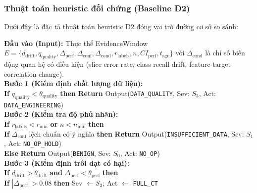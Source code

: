 \subsubsection{Thuật toán heuristic đối chứng (Baseline D2)}
Dưới đây là đặc tả thuật toán heuristic D2 đóng vai trò đường cơ sở so sánh:

\begin{tcolorbox}[colback=gray!3!white,colframe=gray!40!black,arc=2pt,boxrule=0.6pt,top=4pt,bottom=4pt,left=6pt,right=6pt,title=\small\textbf{Thuật toán 1 (Baseline D2): Chẩn đoán heuristic dựa trên tập luật ngưỡng cứng}]\label{alg:heuristic-diagnosis}
\small
\textbf{Đầu vào (Input):} Thực thể EvidenceWindow $E = \{d_\text{drift}, q_\text{quality}, \Delta_\text{perf}, \Delta_\text{conf}, \Delta_\text{cond}, r_\text{labels}, n, CI_\text{perf}, t_\text{age}\}$ với $\Delta_\text{cond}$ là chỉ số biến động quan hệ có điều kiện (slice error rate, class recall drift, feature-target correlation change).\\[0.3em]
\textbf{Bước 1 (Kiểm định chất lượng dữ liệu):}\\
\hspace*{1em}\textbf{If} $q_\text{quality} < \theta_\text{quality}$ \textbf{then} \textbf{Return} Output(\texttt{DATA\_QUALITY}, Sev: $S_3$, Act: \texttt{DATA\_ENGINEERING})\\[0.25em]
\textbf{Bước 2 (Kiểm tra độ phủ nhãn):}\\
\hspace*{1em}\textbf{If} $r_\text{labels} < r_\text{min}$ \textbf{or} $n < n_\text{min}$ \textbf{then}\\
\hspace*{2em}\textbf{If} $\Delta_\text{conf}$ lệch chuẩn có ý nghĩa \textbf{then} \textbf{Return} Output(\texttt{INSUFFICIENT\_DATA}, Sev: $S_1$, Act: \texttt{NO\_OP\_HOLD})\\
\hspace*{2em}\textbf{Else} \textbf{Return} Output(\texttt{BENIGN}, Sev: $S_0$, Act: \texttt{NO\_OP})\\[0.25em]
\textbf{Bước 3 (Kiểm định trôi dạt có hại):}\\
\hspace*{1em}\textbf{If} $d_\text{drift} > \theta_\text{drift}$ \textbf{and} $\Delta_\text{perf} < \theta_\text{perf}$ \textbf{then}\\
\hspace*{2em}\textbf{If} $|\Delta_\text{perf}| > 0.08$ \textbf{then} Sev $\leftarrow S_3$; Act $\leftarrow$ \texttt{FULL\_CT}\\

\end{tcolorbox}
